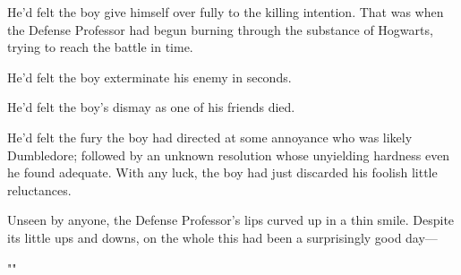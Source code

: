 He'd felt the boy give himself over fully to the killing intention. That was
when the Defense Professor had begun burning through the substance of Hogwarts,
trying to reach the battle in time.

He'd felt the boy exterminate his enemy in seconds.

He'd felt the boy's dismay as one of his friends died.

He'd felt the fury the boy had directed at some annoyance who was likely
Dumbledore; followed by an unknown resolution whose unyielding hardness even he
found adequate. With any luck, the boy had just discarded his foolish little
reluctances.

Unseen by anyone, the Defense Professor's lips curved up in a thin smile.
Despite its little ups and downs, on the whole this had been a surprisingly
good day---

""
